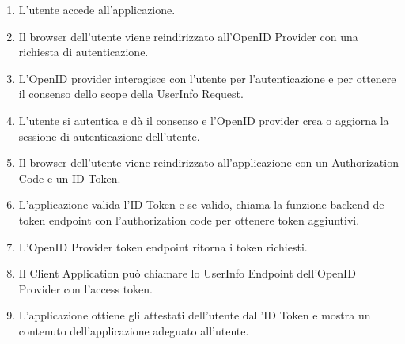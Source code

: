 \begin{enumerate}
      \item L'utente accede all'applicazione.
      \item Il browser dell'utente viene reindirizzato all'OpenID Provider con una
            richiesta di autenticazione.
      \item L'OpenID provider interagisce con l'utente per l'autenticazione e per
            ottenere il consenso dello scope della UserInfo Request.
      \item L'utente si autentica e dà il consenso e l'OpenID provider crea o aggiorna
            la sessione di autenticazione dell'utente.
      \item Il browser dell'utente viene reindirizzato all'applicazione con un
            Authorization Code e un ID Token.
      \item L'applicazione valida l'ID Token e se valido, chiama la funzione backend
            de token endpoint con l'authorization code per ottenere token aggiuntivi.
      \item L'OpenID Provider token endpoint ritorna i token richiesti.
      \item Il Client Application può chiamare lo UserInfo Endpoint dell'OpenID
            Provider con l'access token.
      \item L'applicazione ottiene gli attestati dell'utente dall'ID Token e mostra un
            contenuto dell'applicazione adeguato all'utente.
\end{enumerate}
